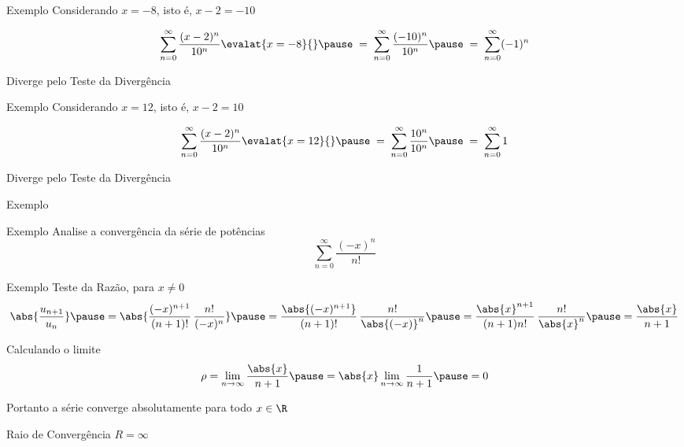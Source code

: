 \documentclass[fleqn,utf8,aspectratio=169,12pt]{beamer}
\begin{document}
\begin{frame}{Exemplo \theexemplo}
  Considerando \(x = -8\), isto é, \(x-2=-10\)

  \pause
  \vspace{\baselineskip}\[
    \sum_{n=0}^\infty \frac{(x-2)^n}{10^n} \evalat{x=-8}{} \pause \;=\;
    \sum_{n=0}^\infty \frac{(-10)^n}{10^n} \pause \;=\;
    \sum_{n=0}^\infty (-1)^n
  \]

  \pause
  \vspace{\baselineskip}
  Diverge pelo Teste da Divergência
\end{frame}

\begin{frame}{Exemplo \theexemplo}
  Considerando \(x = 12\), isto é, \(x-2=10\)

  \pause
  \vspace{\baselineskip}
  \[
    \sum_{n=0}^\infty \frac{(x-2)^n}{10^n} \evalat{x=12}{} \pause \;=\;
    \sum_{n=0}^\infty \frac{10^n}{10^n}    \pause \;=\;
    \sum_{n=0}^\infty 1
  \]

  \pause
  \vspace{\baselineskip}
  Diverge pelo Teste da Divergência
\end{frame}

\begin{frame}{Exemplo \theexemplo}
\end{frame}

\addtocounter{exemplo}{1}
\begin{frame}{Exemplo \theexemplo}
  Analise a convergência da série de potências
  \[
    \sum_{n=0}^\infty \frac{(-x)^n}{n!}
  \]
\end{frame}

\begin{frame}{Exemplo \theexemplo}
  Teste da Razão, para \(x \neq 0\)
  \pause
  \[
    \abs{\frac{u_{n+1}}{u_n}}                                \pause =
    \abs{\frac{(-x)^{n+1}}{(n+1)!}\,\frac{n!}{(-x)^n}}       \pause =
    \frac{\abs{(-x)^{n+1}}}{(n+1)!}\,\frac{n!}{\abs{(-x)}^n} \pause =
    \frac{\abs{x}^{n+1}}{(n+1)n!}\,\frac{n!}{\abs{x}^n}      \pause =
    \frac{\abs{x}}{n+1}
  \]

  \pause
  Calculando o limite
  \[
    \rho
    = \lim_{n\to\infty} \frac{\abs{x}}{n+1}
    \pause
    = \abs{x} \lim_{n\to\infty} \frac{1}{n+1}
    \pause
    = 0
  \]

  \pause
  Portanto a série converge absolutamente para todo \(x\in\R\)

  \pause
  \vspace{0.5\baselineskip}
  Raio de Convergência \(R = \infty\)
\end{frame}
\end{document}
